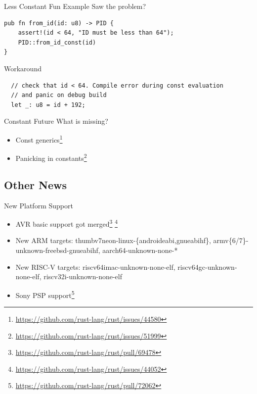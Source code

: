 \documentclass[aspectratio=1610,14pt,t]{beamer}
\begin{document}
\begin{frame}[c,fragile]{Less Constant Fun Example}
  Saw the problem?\pause
  \begin{verbatim}
pub fn from_id(id: u8) -> PID {
    assert!(id < 64, "ID must be less than 64");
    PID::from_id_const(id)
}
  \end{verbatim}
  \pause Workaround
  \begin{verbatim}
  // check that id < 64. Compile error during const evaluation
  // and panic on debug build
  let _: u8 = id + 192;
  \end{verbatim}
\end{frame}

\begin{frame}{Constant Future}
  What is missing?
  \begin{itemize}
    \item Const generics\footnote{\url{https://github.com/rust-lang/rust/issues/44580}}
    \item Panicking in constants\footnote{\url{https://github.com/rust-lang/rust/issues/51999}}
  \end{itemize}
\end{frame}

\subsection{Other News}

\begin{frame}[c]{New Platform Support}
  \begin{itemize}
    \item AVR basic support got merged\footnote{\url{https://github.com/rust-lang/rust/pull/69478}} \footnote{\url{https://github.com/rust-lang/rust/issues/44052}}
    \item New ARM targets: thumbv7neon-linux-\{androideabi,gnueabihf\}, armv\{6/7\}-unknown-freebsd-gnueabihf, aarch64-unknown-none-*
    \item New RISC-V targets: riscv64imac-unknown-none-elf, riscv64gc-unknown-none-elf, riscv32i-unknown-none-elf
    \item Sony PSP support\footnote{\url{https://github.com/rust-lang/rust/pull/72062}}
  \end{itemize}
\end{frame}
\end{document}
